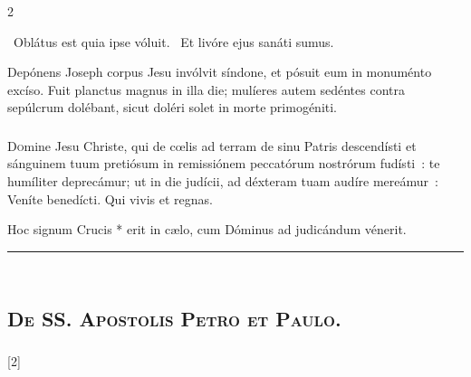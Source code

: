 \documentclass[9pt,twoside]{extarticle}
\begin{document}
\begin{multicols}{2}
{{{\begin{tightlist}{}
\item {}~Oblátus est quia ipse vóluit. ~Et livóre ejus sanáti sumus.
\item {} Depónens Joseph corpus Jesu invólvit síndone, et pósuit eum in monuménto excíso. Fuit planctus magnus in illa die; mulíeres autem sedéntes contra sepúlcrum dolébant, sicut doléri solet in morte primogéniti.
\end{tightlist}

\subsubsection*{\center{}}
\lettrine{D}omine Jesu Christe, qui de cœlis ad terram de sinu Patris descendísti et sánguinem tuum pretiósum in remissiónem peccatórum nostrórum fudísti~: te humíliter deprecámur; ut in die judícii, ad déxteram tuam audíre mereámur~: Veníte benedícti. Qui vivis et regnas.

\begin{tightlist}{}
\item {}
\item {} Hoc signum Crucis * erit in cælo, cum Dóminus ad judicándum vénerit.
\end{tightlist}

\begin{center}\textcolor{red}{\rule{\linewidth}{0.5pt}} \end{center}

\subsection*{\center {}}
\subsection*{\center \textsc{\\ De SS. Apostolis Petro et Paulo.}}
\subsubsection*{\center {}}

\begin{tightlist}{}
\item {} [2] 
\end{tightlist}

}}}
\end{multicols}
\end{document}
